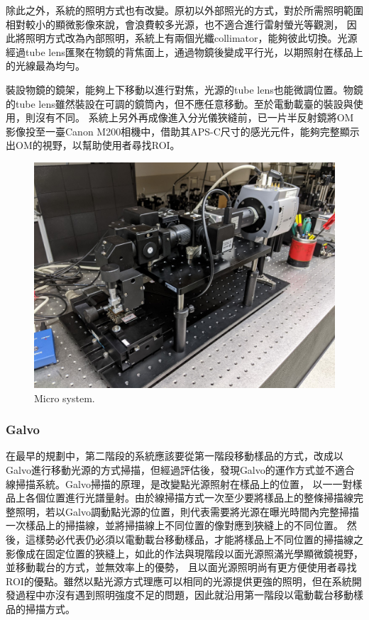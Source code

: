 \documentclass[12pt]{article}
\begin{document}
除此之外，系統的照明方式也有改變。原初以外部照光的方式，對於所需照明範圍相對較小的顯微影像來說，會浪費較多光源，也不適合進行雷射螢光等觀測，
因此將照明方式改為內部照明，系統上有兩個光纖collimator，能夠彼此切換。光源經過tube lens匯聚在物鏡的背焦面上，通過物鏡後變成平行光，以期照射在樣品上的光線最為均勻。

裝設物鏡的鏡架，能夠上下移動以進行對焦，光源的tube lens也能微調位置。物鏡的tube lens雖然裝設在可調的鏡筒內，但不應任意移動。至於電動載臺的裝設與使用，則沒有不同。
系統上另外再成像進入分光儀狹縫前，已一片半反射鏡將OM影像投至一臺Canon M200相機中，借助其APS-C尺寸的感光元件，能夠完整顯示出OM的視野，以幫助使用者尋找ROI。
\begin{figure}
    \centering
    \includegraphics[width=\linewidth]{microSystemPixel3.jpg}
    \caption{Micro system.}
\end{figure}

\subsubsection{Galvo}
在最早的規劃中，第二階段的系統應該要從第一階段移動樣品的方式，改成以Galvo進行移動光源的方式掃描，但經過評估後，發現Galvo的運作方式並不適合線掃描系統。Galvo掃描的原理，是改變點光源照射在樣品上的位置，
以一一對樣品上各個位置進行光譜量射。由於線掃描方式一次至少要將樣品上的整條掃描線完整照明，若以Galvo調動點光源的位置，則代表需要將光源在曝光時間內完整掃描一次樣品上的掃描線，並將掃描線上不同位置的像對應到狹縫上的不同位置。
然後，這樣勢必代表仍必須以電動載台移動樣品，才能將樣品上不同位置的掃描線之影像成在固定位置的狹縫上，如此的作法與現階段以面光源照滿光學顯微鏡視野，並移動載台的方式，並無效率上的優勢，
且以面光源照明尚有更方便使用者尋找ROI的優點。雖然以點光源方式理應可以相同的光源提供更強的照明，但在系統開發過程中亦沒有遇到照明強度不足的問題，因此就沿用第一階段以電動載台移動樣品的掃描方式。
\end{document}
